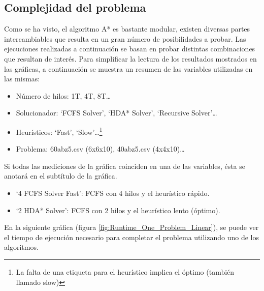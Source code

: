 \subsection{Complejidad del problema}

\begin{notebox}
    Como se ha visto, el algoritmo A* es bastante modular,
    existen diversas partes intercambiables que resulta en un gran
    número de posibilidades a probar.
    Las ejecuciones realizadas a continuación se basan en probar
    distintas combinaciones que resultan de interés.
    Para simplificar la lectura de los resultados mostrados
    en las gráficas, a continuación se muestra un resumen de
    las variables utilizadas en las mismas:

    \begin{itemize}[itemsep=0.25px]
        \item Número de hilos: 1T, 4T, 8T\dots
        \item Solucionador: `FCFS Solver', `HDA* Solver', `Recursive Solver'\dots
        \item Heurísticos: `Fast', `Slow'\dots\footnote{La falta de una etiqueta para el heurístico implica el óptimo (también llamado slow)}
        \item Problema: 60\percentsign abz5.csv (6x6x10), 40\percentsign abz5.csv (4x4x10)\dots
    \end{itemize}

    Si todas las mediciones de la gráfica coinciden en una de las
    variables, ésta se anotará en el subtítulo de la gráfica.

    \begin{examplebox}
        \begin{itemize}[itemsep=0.25px]
            \item `4 FCFS Solver Fast': FCFS con 4 hilos y el heurístico rápido.
            \item `2 HDA* Solver': FCFS con 2 hilos y el heurístico lento (óptimo).
        \end{itemize}
    \end{examplebox}
\end{notebox}

\pagebreak

En la siguiente gráfica (figura \ref{fig:Runtime_One_Problem_Linear}),
se puede ver el tiempo de ejecución
necesario para completar el problema utilizando uno de los
algoritmos.

